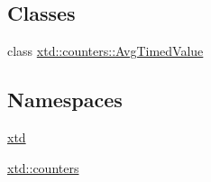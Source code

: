 \subsection*{Classes}
\begin{DoxyCompactItemize}
\item 
class \hyperlink{classxtd_1_1counters_1_1AvgTimedValue}{xtd\+::counters\+::\+Avg\+Timed\+Value}
\end{DoxyCompactItemize}
\subsection*{Namespaces}
\begin{DoxyCompactItemize}
\item 
 \hyperlink{namespacextd}{xtd}
\item 
 \hyperlink{namespacextd_1_1counters}{xtd\+::counters}
\end{DoxyCompactItemize}
